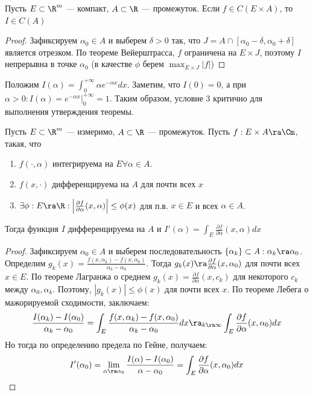 \begin{corollary}
    Пусть \(E \subset \R^m\) --- компакт, \(A \subset \R\) --- промежуток. Если \(f \in C(E \times A)\), то \(I \in C(A)\)
\end{corollary}
\begin{proof}
    Зафиксируем \(\alpha_0 \in A\) и выберем \(\delta > 0\) так, что \(J = A \cap [\alpha_0 - \delta, \alpha_0 + \delta]\) является отрезком. По теореме Вейерштрасса, \(f\) ограничена на \(E \times J\), поэтому \(I\) непрерывна в точке \(\alpha_0\) (в качестве \(\phi\) берем \(\max_{E\times J} |f|\))
\end{proof}

\begin{example}
    Положим \(I(\alpha) = \int_0^{+\infty} \alpha e^{-\alpha x}dx\). Заметим, что \(I(0) = 0\), а при \(\alpha > 0: I(\alpha) = e^{-\alpha x}\big|_0^{+\infty} = 1\). Таким образом, условие 3 критично для выполнения утверждения теоремы.
\end{example}


\begin{theorem}[О дифференцируемости]
    Пусть \(E \subset \R^m\) --- измеримо, \(A \subset \R\) --- промежуток. Пусть \(f: E \times A \ra \Cm\), такая, что 
    \begin{enumerate}
        \item \(f(\cdot, \alpha)\) интегрируема на \(E \forall \alpha \in A\).
        \item \(f(x, \cdot)\) дифференцируема на \(A\) для почти всех \(x\)
        \item \(\exists \phi: E \ra \R: \left| \frac{\partial f}{\partial \alpha}(x, \alpha) \right| \le \phi(x)\) для п.в. \(x \in E\) и всех \(\alpha \in A\).
    \end{enumerate}
    Тогда функция \(I\) дифференцируема на \(A\) и \(I'(\alpha) = \int_E \frac{\partial f}{\partial \alpha}(x, \alpha) dx\)
\end{theorem}
\begin{proof}
    Зафиксируем \(\alpha_0 \in A\) и выберем последовательность \(\{\alpha_k\} \subset A: \alpha_k \ra \alpha_0\). Определим \(g_k(x) = \frac{f(x, \alpha_k) - f(x, \alpha_0)}{\alpha_k - \alpha_0}\). Тогда \(g_k(x) \ra \frac{\partial f}{\partial \alpha}(x, \alpha_0)\) для почти всех \(x \in E\). По теореме Лагранжа о среднем \(g_k(x) = \frac{\partial f}{\partial \alpha}(x, c_k)\) для некоторого \(c_k\) между \(\alpha_0, \alpha_k\). Поэтому, \(|g_k(x)| \le \phi(x)\) для почти всех \(x\). По теореме Лебега о мажорируемой сходимости, заключаем:
    \[\frac{I(\alpha_k) - I(\alpha_0)}{\alpha_k - \alpha_0} = \int_E \frac{f(x, \alpha_k) - f(x, \alpha_0)}{\alpha_k - \alpha_0} dx \ra_{k \ra \infty} \int_E \frac{\partial f}{\partial \alpha}(x, \alpha_0) dx\]
    Но тогда по определению предела по Гейне, получаем:
    \[I'(\alpha_0) = \lim_{\alpha \ra \alpha_0} \frac{I(\alpha) - I(\alpha_0)}{\alpha - \alpha_0} = \int_E \frac{\partial f}{\partial \alpha}(x, \alpha_0) dx\]
\end{proof}

